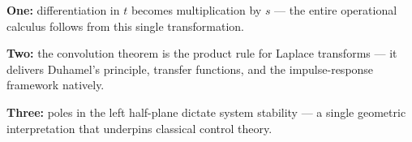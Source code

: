 \documentclass[11pt]{article}
\begin{document}
\begin{conceptbox}
\textbf{One:} differentiation in $t$ becomes \textcolor{accentorange}{multiplication by $s$} --- the entire operational calculus follows from this single transformation.

\smallskip
\textbf{Two:} the \textcolor{accentorange}{convolution theorem} is the product rule for Laplace transforms --- it delivers Duhamel's principle, transfer functions, and the impulse-response framework natively.

\smallskip
\textbf{Three:} \textcolor{accentorange}{poles in the left half-plane} dictate system stability --- a single geometric interpretation that underpins classical control theory.
\end{conceptbox}
\end{document}
